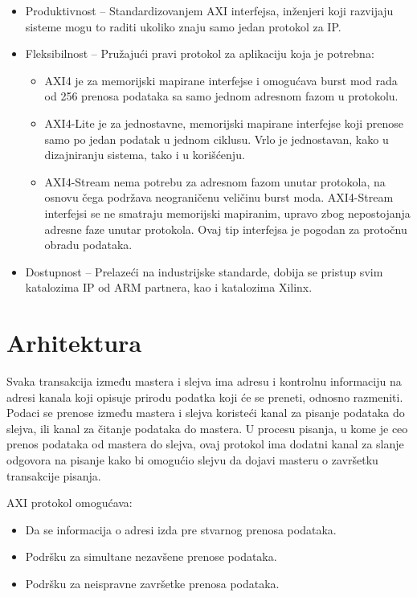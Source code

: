 \documentclass[a4paper, 12pt, diplomski]{etf}
\begin{document}
	\begin{itemize}

		\item Produktivnost – Standardizovanjem AXI interfejsa, inženjeri koji razvijaju sisteme mogu to raditi ukoliko znaju samo jedan protokol za IP.
		\item Fleksibilnost – Pružajući pravi protokol za aplikaciju koja je potrebna:

			\begin{itemize}

			\item AXI4 je za memorijski mapirane interfejse i omogućava burst mod rada od 256 prenosa podataka sa samo jednom adresnom fazom u protokolu.
			\item AXI4-Lite je za jednostavne, memorijski mapirane interfejse koji prenose samo po jedan podatak u jednom ciklusu. Vrlo je jednostavan, kako u dizajniranju sistema, tako i u korišćenju.
			\item AXI4-Stream nema potrebu za adresnom fazom unutar protokola, na osnovu čega podržava neograničenu veličinu burst moda. AXI4-Stream interfejsi se ne smatraju memorijski mapiranim, upr\-avo zbog nepostojanja adresne faze unutar protokola. Ovaj tip interfejsa je pogodan za protočnu obradu podataka.

			\end{itemize}


		\item Dostupnost – Prelazeći na industrijske standarde, dobija se pristup svim katalozima IP od ARM partnera, kao i katalozima Xilinx.

	\end{itemize}

	\section{Arhitektura}

	Svaka transakcija između mastera i slejva ima adresu i kontrolnu informaciju na adresi kanala koji opisuje prirodu podatka koji će se preneti, odnosno razmeniti. Podaci se prenose između mastera i slejva koristeći kanal za pisanje podataka do slejva, ili kanal za čitanje podataka do mastera. U procesu pisanja, u kome je ceo prenos podataka od mastera do slejva, ovaj protokol ima dodatni kanal za slanje odgovora na pisanje kako bi omogućio slejvu da dojavi masteru o završetku transakcije pisanja.

	AXI protokol omogućava:

	\begin{itemize}

		\item Da se informacija o adresi izda pre stvarnog prenosa podataka.
		\item Podršku za simultane nezavšene prenose podataka.
		\item Podršku za neispravne završetke prenosa podataka.

	\end{itemize}
\end{document}
